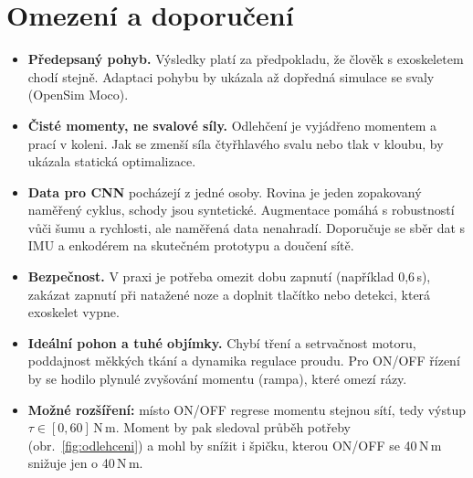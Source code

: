 \documentclass[11pt,a4paper]{article}
\newcommand{\Nm}{\,N\,m}
\begin{document}
\section{Omezení a doporučení}
\begin{itemize}
  \item \textbf{Předepsaný pohyb.} Výsledky platí za předpokladu, že člověk s exoskeletem chodí stejně.
        Adaptaci pohybu by ukázala až dopředná simulace se svaly (OpenSim Moco).
  \item \textbf{Čisté momenty, ne svalové síly.} Odlehčení je vyjádřeno momentem a prací v koleni.
        Jak se zmenší síla čtyřhlavého svalu nebo tlak v kloubu, by ukázala statická optimalizace.
  \item \textbf{Data pro CNN} pocházejí z jedné osoby. Rovina je jeden zopakovaný naměřený cyklus,
        schody jsou syntetické. Augmentace pomáhá s robustností vůči šumu a rychlosti, ale
        naměřená data nenahradí. Doporučuje se sběr dat s IMU a enkodérem na skutečném prototypu
        a doučení sítě.
  \item \textbf{Bezpečnost.} V praxi je potřeba omezit dobu zapnutí (například 0,6\,s), zakázat
        zapnutí při natažené noze a doplnit tlačítko nebo detekci, která exoskelet vypne.
  \item \textbf{Ideální pohon a tuhé objímky.} Chybí tření a setrvačnost motoru, poddajnost
        měkkých tkání a dynamika regulace proudu. Pro ON/OFF řízení by se hodilo plynulé
        zvyšování momentu (rampa), které omezí rázy.
  \item \textbf{Možné rozšíření:} místo ON/OFF regrese momentu stejnou sítí, tedy výstup
        $\tau\in[0, 60]$\Nm. Moment by pak sledoval průběh potřeby (obr.~\ref{fig:odlehceni})
        a mohl by snížit i špičku, kterou ON/OFF se 40\Nm{} snižuje jen o 40\Nm.
\end{itemize}

\appendix
\end{document}
